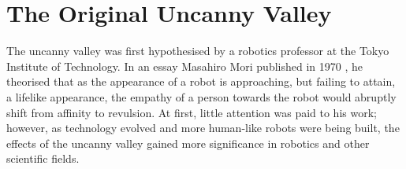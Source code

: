 \chapter{The Original Uncanny Valley}
\label{chap:2}
The uncanny valley was first hypothesised by a robotics professor at the Tokyo Institute of Technology. In an essay Masahiro Mori published in 1970 \cite{original_masahiro_not_translated}, he theorised that as the appearance of a robot is approaching, but failing to attain, a lifelike appearance, the empathy of a person towards the robot would abruptly shift from affinity to revulsion.
At first, little attention was paid to his work; however, as technology evolved and more human-like robots were being built, the effects of the uncanny valley gained more significance in robotics and other scientific fields.

